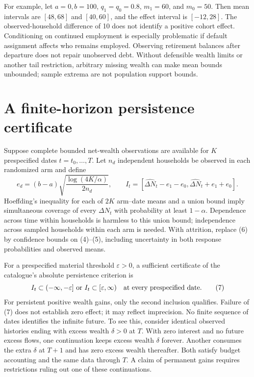 \documentclass[11pt]{article}
\begin{document}
For example, let $a=0,b=100$, $q_1=q_0=0.8$, $m_1=60$, and $m_0=50$.
Then mean intervals are $[48,68]$ and $[40,60]$, and the effect interval
is $[-12,28]$. The observed-household difference of 10 does not identify a
positive cohort effect. Conditioning on continued employment is especially
problematic if default assignment affects who remains employed. Observing
retirement balances after departure does not repair unobserved debt.
Without defensible wealth limits or another tail restriction, arbitrary
missing wealth can make mean bounds unbounded; sample extrema are not
population support bounds.

\section{A finite-horizon persistence certificate}
Suppose complete bounded net-wealth observations are available for $K$
prespecified dates $t=t_0,\ldots,T$. Let $n_d$ independent households be
observed in each randomized arm and define
\[
 e_d=(b-a)\sqrt{\frac{\log(4K/\alpha)}{2n_d}},\qquad
 I_t=[\widehat{\Delta N}_t-e_1-e_0,
      \widehat{\Delta N}_t+e_1+e_0].                     \tag{6}
\]
Hoeffding's inequality for each of $2K$ arm--date means and a union bound
imply simultaneous coverage of every $\Delta N_t$ with probability at
least $1-\alpha$. Dependence across time within households is harmless to
this union bound; independence across sampled households within each arm
is needed. With attrition, replace (6) by confidence bounds on (4)--(5),
including uncertainty in both response probabilities and observed means.

For a prespecified material threshold $\varepsilon>0$, a sufficient
certificate of the catalogue's absolute persistence criterion is
\[
 I_t\subset(-\infty,-\varepsilon]\ \hbox{or}\
 I_t\subset[\varepsilon,\infty)
 \quad\hbox{at every prespecified date}.                 \tag{7}
\]
For persistent positive wealth gains, only the second inclusion qualifies.
Failure of (7) does not establish zero effect; it may reflect imprecision.
No finite sequence of dates identifies the infinite future. To see this,
consider identical observed histories ending with excess wealth $\delta>0$
at $T$. With zero interest and no future excess flows, one continuation
keeps excess wealth $\delta$ forever. Another consumes the extra $\delta$
at $T+1$ and has zero excess wealth thereafter. Both satisfy budget
accounting and the same data through $T$. A claim of permanent gains
requires restrictions ruling out one of these continuations.
\end{document}
